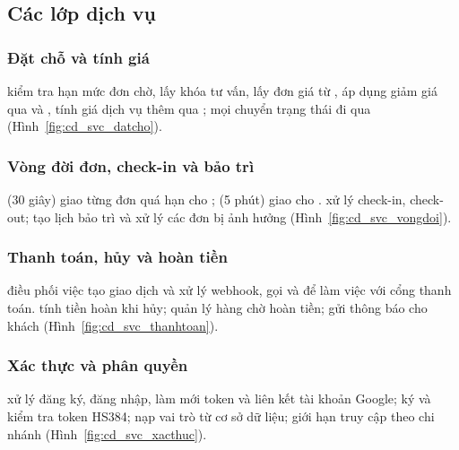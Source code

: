 
\subsection{Các lớp dịch vụ}
\label{ssec:lop_dichvu}

\subsubsection{Đặt chỗ và tính giá}
 kiểm tra hạn mức đơn chờ, lấy khóa tư vấn, lấy đơn giá từ , áp dụng giảm giá qua  và , tính giá dịch vụ thêm qua ; mọi chuyển trạng thái đi qua  (Hình~\ref{fig:cd_svc_datcho}).


\subsubsection{Vòng đời đơn, check-in và bảo trì}
 (30 giây) giao từng đơn quá hạn cho ;  (5 phút) giao cho .  xử lý check-in, check-out;  tạo lịch bảo trì và xử lý các đơn bị ảnh hưởng (Hình~\ref{fig:cd_svc_vongdoi}).


\subsubsection{Thanh toán, hủy và hoàn tiền}
 điều phối việc tạo giao dịch và xử lý webhook, gọi  và  để làm việc với cổng thanh toán.  tính tiền hoàn khi hủy;  quản lý hàng chờ hoàn tiền;  gửi thông báo cho khách (Hình~\ref{fig:cd_svc_thanhtoan}).


\subsubsection{Xác thực và phân quyền}
 xử lý đăng ký, đăng nhập, làm mới token và liên kết tài khoản Google;  ký và kiểm tra token HS384;  nạp vai trò từ cơ sở dữ liệu;  giới hạn truy cập theo chi nhánh (Hình~\ref{fig:cd_svc_xacthuc}).

